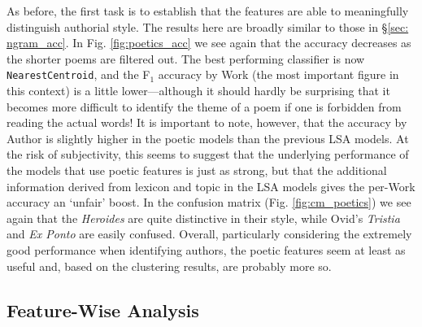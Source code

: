 \documentclass[twocolumn, switch, a4paper]{article} %
\begin{document}
As before, the first task is to establish that the features are able to
meaningfully distinguish authorial style. The results here are broadly similar
to those in \S \ref{sec: ngram_acc}. In Fig. \ref{fig:poetics_acc} we see
again that the accuracy decreases as the shorter poems are filtered out. The
best performing classifier is now \texttt{NearestCentroid}, and the F$_1$
accuracy by Work (the most important figure in this context) is a little
lower---although it should hardly be surprising that it becomes more difficult
to identify the theme of a poem if one is forbidden from reading the actual
words! It is important to note, however, that the accuracy by Author is
slightly higher in the poetic models than the previous LSA models. At the risk
of subjectivity, this seems to suggest that the underlying performance of the
models that use poetic features is just as strong, but that the additional
information derived from lexicon and topic in the LSA models gives the
per-Work accuracy an `unfair' boost. In the confusion matrix (Fig.
\ref{fig:cm_poetics}) we see again that the \emph{Heroides} are quite
distinctive in their style, while Ovid's \emph{Tristia} and \emph{Ex Ponto}
are easily confused. Overall, particularly considering the extremely good
performance when identifying authors, the poetic features seem at least as
useful and, based on the clustering results, are probably more so.

\subsection{Feature-Wise Analysis}
\end{document}
